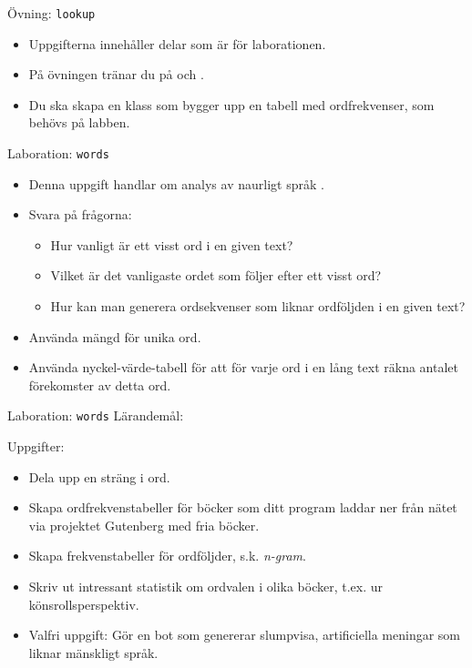 


\begin{Slide}{Övning: \texttt{lookup}}
\begin{itemize}
  \item Uppgifterna innehåller delar som är  för laborationen.
  \item På övningen tränar du på  och .
  \item Du ska skapa en klass  som bygger upp en tabell med ordfrekvenser, som behövs på labben.
\end{itemize}
\end{Slide}

\begin{Slide}{Laboration: \texttt{words}}
\begin{itemize}
  \item Denna uppgift handlar om analys av naurligt språk .
  \item Svara på frågorna:
  \begin{itemize}%
  \item Hur vanligt är ett visst ord i en given text?
  \item Vilket är det vanligaste ordet som följer efter ett visst ord?
  \item Hur kan man generera ordsekvenser som liknar ordföljden i en given text?
  \end{itemize}
\item Använda mängd för unika ord.
\item Använda nyckel-värde-tabell för att för varje ord i en lång text räkna antalet förekomster av detta ord.
\end{itemize}
\end{Slide}


\begin{Slide}{Laboration: \texttt{words}}
Lärandemål:
\begin{itemize}\SlideFontSmall

\end{itemize}
Uppgifter:
\begin{itemize}\SlideFontSmall
  \item Dela upp en sträng i ord.
  \item Skapa ordfrekvenstabeller för böcker som ditt program laddar ner från nätet via projektet Gutenberg med fria böcker.
  \item Skapa frekvenstabeller för ordföljder, s.k. \emph{n-gram}.
  \item Skriv ut intressant statistik om ordvalen i olika böcker, t.ex. ur könsrollsperspektiv.
  \item Valfri uppgift: Gör en bot som genererar slumpvisa, artificiella meningar som liknar mänskligt språk.
\end{itemize}
\end{Slide}



